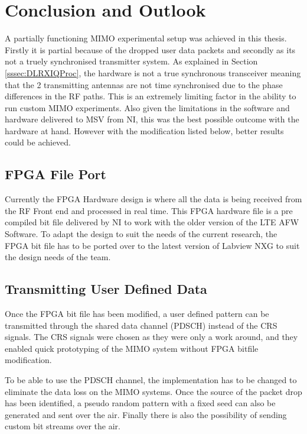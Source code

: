 \chapter{Conclusion and Outlook}\label{ch:conOutlook}

A partially functioning MIMO experimental setup was achieved in this thesis. Firstly it is partial because of the dropped user data packets and secondly as its not a truely synchronised transmitter system. As explained in Section \ref{sssec:DLRXIQProc}, the hardware is not a true synchronous transceiver meaning that the 2 transmitting antennas are not time synchronised due to the phase differences in the RF paths. This is an extremely limiting factor in the ability to run custom MIMO experiments. Also given the limitations in the software and hardware delivered to MSV from NI, this was the best possible outcome with the hardware at hand. However with the modification listed below, better results could be achieved.

\section{FPGA File Port}\label{sec:FPGAChange}
Currently the FPGA Hardware design is where all the data is being received from the RF Front end and processed in real time. This FPGA hardware file is a pre compiled bit file delivered by NI to work with the older version of the LTE AFW Software. To adapt the design to suit the needs of the current research, the FPGA bit file has to be ported over to the latest version of Labview NXG to suit the design needs of the team.

\section{Transmitting User Defined Data}\label{sec:TransUserDefData}
Once the FPGA bit file has been modified, a user defined pattern can be transmitted through the shared data channel (PDSCH) instead of the CRS signals. The CRS signals were chosen as they were only a work around, and they enabled quick prototyping of the MIMO system without FPGA bitfile modification.

To be able to use the PDSCH channel, the implementation has to be changed to eliminate the data loss on the MIMO systems. Once the source of the packet drop has been identified, a pseudo random pattern with a fixed seed can also be generated and sent over the air. Finally there is also the possibility of sending custom bit streams over the air.

